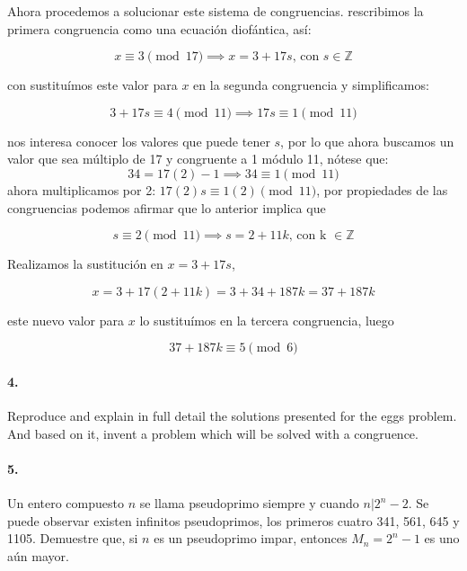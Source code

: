 \documentclass{article}
\begin{document}
Ahora procedemos a solucionar este sistema de congruencias. rescribimos la primera congruencia como una ecuación diofántica, así:

$$x \equiv 3 \pmod{17} \implies x = 3 + 17s \text{, con } s \in \mathbb{Z}$$

con sustituímos este valor para $x$ en la segunda congruencia y simplificamos:

$$3 + 17s \equiv 4 \pmod{11} \implies 17s \equiv 1 \pmod{11}$$

nos interesa conocer los valores que puede tener $s$, por lo que ahora buscamos un valor que sea múltiplo de 17 y congruente a 1 módulo 11, nótese que:
$$34 = 17(2) - 1 \implies 34 \equiv 1 \pmod{11}$$
ahora multiplicamos por 2: $17(2)s \equiv 1(2) \pmod{11}$, por propiedades de las congruencias podemos afirmar que lo anterior implica que 

$$s \equiv 2 \pmod{11} \implies s = 2 + 11k \text{, con k } \in \mathbb{Z}$$

Realizamos la sustitución en $x = 3 + 17s$,

$$x = 3 + 17(2 + 11k) = 3 + 34 + 187k = 37 + 187k$$

este nuevo valor para $x$ lo sustituímos en la tercera congruencia, luego

$$37 + 187k \equiv 5 \pmod{6}$$


\paragraph{4.} Reproduce and explain in full detail the solutions presented for the eggs problem. And based on it, invent a problem which will be solved with a congruence.

\paragraph{5.} Un entero compuesto $n$ se llama pseudoprimo siempre y cuando $n|2^n - 2$. Se puede observar existen infinitos pseudoprimos, los primeros cuatro 341, 561, 645 y 1105. Demuestre que, si $n$ es un pseudoprimo impar, entonces $M_n = 2^n - 1$ es uno aún mayor.
\end{document}
